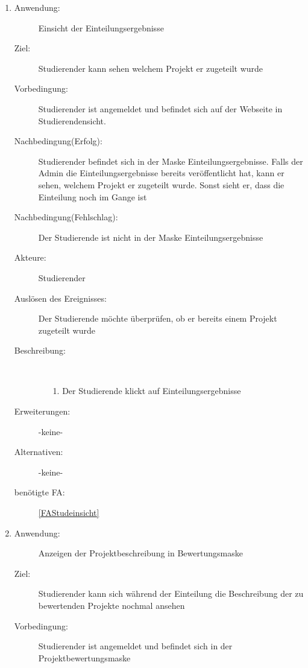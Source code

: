 \documentclass[parskip=full]{scrartcl}
\newcommand{\swtLabel}[1]{\textbf{/#1\arabic*0/}}
\begin{document}
\begin{enumerate}[label=\swtLabel{S}]
     \item \label{UCstudEinsichtEinteilung}
  \begin{description}
  \item[Anwendung:] Einsicht der Einteilungsergebnisse
  \item[Ziel:] \gls{Studierender} kann sehen welchem \gls{Projekt} er
  zugeteilt wurde
  	\item[Vorbedingung:] \gls{Studierender} ist angemeldet und befindet sich auf der
  	Webseite in Studierendensicht. 
  	\item[Nachbedingung(Erfolg):] \gls{Studierender} befindet sich in der Maske
  	Einteilungsergebnisse. %
  	Falls der \gls{Admin} die Einteilungsergebnisse bereits veröffentlicht hat,
  	kann er sehen, welchem \gls{Projekt} er zugeteilt wurde. Sonst sieht er, dass
  	die Einteilung noch im Gange ist %
  	\item[Nachbedingung(Fehlschlag):] Der Studierende ist nicht in der
  	Maske Einteilungsergebnisse
  	\item[Akteure:] \gls{Studierender}
  	\item[Auslösen des Ereignisses:] Der Studierende möchte überprüfen, ob er
  	bereits einem Projekt zugeteilt wurde
  	\item[Beschreibung:]~
  	\begin{enumerate}
  	  \item[1.] Der Studierende klickt auf Einteilungsergebnisse
 
  	\end{enumerate}
  	\item[Erweiterungen:] -keine-

  	\item[Alternativen:] -keine-
  	
  	 \item[benötigte FA:] \ref{FAStudeinsicht}
  \end{description}
  
    \item \label{UCstudProjektbeschreibung}
  \begin{description}
  \item[Anwendung:] Anzeigen der Projektbeschreibung in Bewertungsmaske
  \item[Ziel:] Studierender kann sich während der Einteilung die Beschreibung
  der zu bewertenden Projekte nochmal ansehen
  	\item[Vorbedingung:] Studierender ist angemeldet und befindet sich in der
  	Projektbewertungsmaske %
  	

\end{description}
\end{enumerate}
\end{document}
